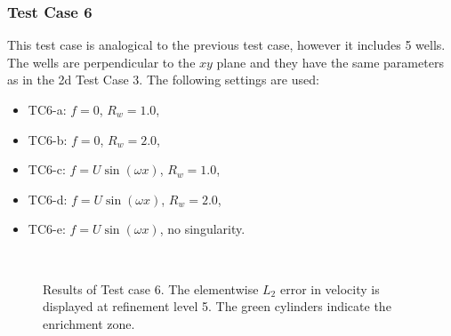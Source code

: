\subsubsection{Test Case 6}
This test case is analogical to the previous test case, however it includes 5 wells.
The wells are perpendicular to the $xy$ plane and they have the same parameters as in the 2d Test Case 3.
The following settings are used:
\begin{itemize}
    \item TC6-a: $f=0$, $R_w=1.0$,
    \item TC6-b: $f=0$, $R_w=2.0$,
    \item TC6-c: $f=U\sin(\omega x)$, $R_w=1.0$,
    \item TC6-d: $f=U\sin(\omega x)$, $R_w=2.0$,
    \item TC6-e: $f=U\sin(\omega x)$, no singularity.
\end{itemize}
%
\begin{figure}[!htb]
    \centering
     \\
    \caption[Error distribution in Test case 6.]
    {Results of Test case 6. The elementwise $L_2$ error in velocity is displayed at refinement level 5.
    The green cylinders indicate the enrichment zone. }
    \label{fig:mh_tc6_error}
\end{figure}
%

